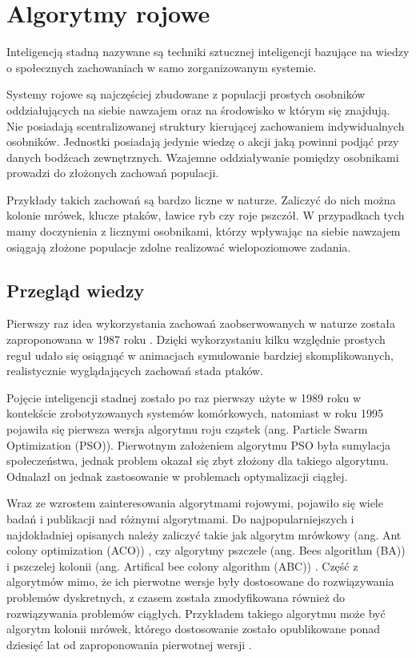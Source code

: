 \chapter{Algorytmy rojowe}
\label{cha:pso}
Inteligencją stadną nazywane są techniki sztucznej inteligencji bazujące na wiedzy o społecznych zachowaniach w samo zorganizowanym systemie. 

Systemy rojowe są najczęściej zbudowane z populacji prostych osobników oddziałujących na siebie nawzajem oraz na środowisko w którym się znajdują. Nie posiadają scentralizowanej struktury kierującej zachowaniem indywidualnych osobników. Jednostki posiadają jedynie wiedzę o akcji jaką powinni podjąć przy danych bodźcach zewnętrznych. Wzajemne oddziaływanie pomiędzy osobnikami prowadzi do złożonych zachowań populacji.

Przykłady takich zachowań są bardzo liczne w naturze. Zaliczyć do nich można kolonie mrówek, klucze ptaków, ławice ryb czy roje pszczół. W przypadkach tych mamy doczynienia z licznymi osobnikami, którzy wpływając na siebie nawzajem osiągają złożone populacje zdolne realizować wielopoziomowe zadania.


\section{Przegląd wiedzy}
\label{sec:historiarojowych}
Pierwszy raz idea wykorzystania zachowań zaobserwowanych w naturze została zaproponowana w 1987 roku \cite{Reynolds87}. Dzięki wykorzystaniu kilku względnie prostych reguł udało się osiągnąć w animacjach symulowanie bardziej skomplikowanych, realistycznie wyglądających zachowań stada ptaków. 

Pojęcie inteligencji stadnej zostało po raz pierwszy użyte w 1989 roku\cite{BeniWang89} w kontekście zrobotyzowanych systemów komórkowych, natomiast w roku 1995 \cite{KennedyEberhart95} pojawiła się pierwsza wersja algorytmu roju cząstek (ang. Particle Swarm Optimization (PSO)). Pierwotnym założeniem algorytmu PSO była sumylacja społeczeństwa, jednak problem okazał się zbyt złożony dla takiego algorytmu. Odnalazł on jednak zastosowanie w problemach optymalizacji ciągłej.

Wraz ze wzrostem zainteresowania algorytmami rojowymi, pojawiło się wiele badań i publikacji nad różnymi algorytmami. Do najpopularniejszych i najdokładniej opisanych należy zaliczyć takie jak algorytm mrówkowy (ang. Ant colony optimization (ACO)) \cite{ACO}, czy algorytmy pszczele (ang. Bees algorithm (BA)) \cite{BA} i pszczelej kolonii (ang. Artifical bee colony algorithm (ABC)) \cite{ABC}. Część z algorytmów mimo, że ich pierwotne wersje były dostosowane do rozwiązywania problemów dyskretnych, z czasem została zmodyfikowana również do rozwiązywania problemów ciągłych. Przykładem takiego algorytmu może być algorytm kolonii mrówek, którego dostosowanie zostało opublikowane ponad dziesięć lat od zaproponowania pierwotnej wersji \cite{ACO2}. 

